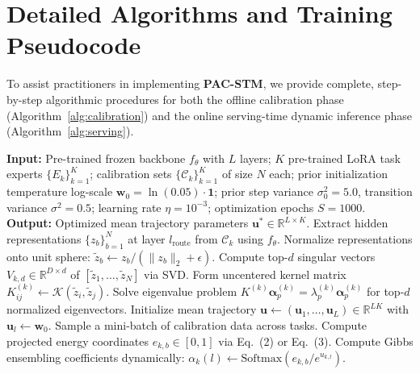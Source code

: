 \section{Detailed Algorithms and Training Pseudocode}
\label{sec:appendix_algorithms}

To assist practitioners in implementing \textbf{PAC-STM}, we provide complete, step-by-step algorithmic procedures for both the offline calibration phase (Algorithm~\ref{alg:calibration}) and the online serving-time dynamic inference phase (Algorithm~\ref{alg:serving}).

\begin{algorithm}[tb]
\caption{PAC-STM Offline Calibration Phase}
\label{alg:calibration}
\begin{algorithmic}[1]
\STATE \textbf{Input:} Pre-trained frozen backbone $f_\theta$ with $L$ layers; $K$ pre-trained LoRA task experts $\{E_k\}_{k=1}^K$; calibration sets $\{\mathcal{C}_k\}_{k=1}^K$ of size $N$ each; prior initialization temperature log-scale $\mathbf{w}_0 = \ln(0.05) \cdot \mathbf{1}$; prior step variance $\sigma_0^2 = 5.0$, transition variance $\sigma^2 = 0.5$; learning rate $\eta = 10^{-3}$; optimization epochs $S = 1000$.
\STATE \textbf{Output:} Optimized mean trajectory parameters $\mathbf{u}^* \in \mathbb{R}^{L \times K}$.
\STATE {}
    \STATE Extract hidden representations $\{z_b\}_{b=1}^N$ at layer $l_{\text{route}}$ from $\mathcal{C}_k$ using $f_\theta$.
    \STATE Normalize representations onto unit sphere: $\tilde{z}_b \leftarrow z_b / (\|z_b\|_2 + \epsilon)$.
        \STATE Compute top-$d$ singular vectors $V_{k, d} \in \mathbb{R}^{D \times d}$ of $[\tilde{z}_1, \dots, \tilde{z}_N]$ via SVD.
        \STATE Form uncentered kernel matrix $K^{(k)}_{ij} \leftarrow \mathcal{K}(\tilde{z}_i, \tilde{z}_j)$.
        \STATE Solve eigenvalue problem $K^{(k)} \boldsymbol{\alpha}^{(k)}_p = \lambda^{(k)}_p \boldsymbol{\alpha}^{(k)}_p$ for top-$d$ normalized eigenvectors.
    \ENDIF
\ENDFOR
\STATE {}
\STATE Initialize mean trajectory $\mathbf{u} \leftarrow (\mathbf{u}_1, \dots, \mathbf{u}_L) \in \mathbb{R}^{LK}$ with $\mathbf{u}_l \leftarrow \mathbf{w}_0$.
    \STATE Sample a mini-batch of calibration data across tasks.
    \STATE Compute projected energy coordinates $e_{k, b} \in [0, 1]$ via Eq.~(2) or Eq.~(3).
    \STATE Compute Gibbs ensembling coefficients dynamically: $\alpha_k(l) \leftarrow \text{Softmax}(e_{k, b} / e^{u_{k, l}})$.

\end{algorithmic}
\end{algorithm}
